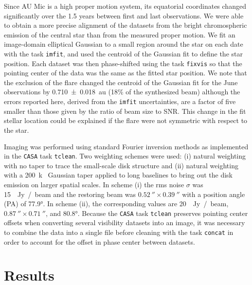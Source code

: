 \documentclass[modern]{aastex62}
\begin{document}
Since AU Mic is a high proper motion system, its equatorial coordinates changed significantly over the 1.5 years between first and last observations.  
We were able to obtain a more precise alignment of the datasets from the bright chromospheric emission of the central star than from the measured proper motion.
We fit an image-domain elliptical Gaussian to a small region around the star on each date with the task \texttt{imfit}, and used the centroid of the Gaussian fit to define the star position.
Each dataset was then phase-shifted using the task \texttt{fixvis} so that the pointing center of the data was the same as the fitted star position.
We note that the exclusion of the flare changed the centroid of the Gaussian fit for the June observations by \SI{0.710 \pm 0.018}{au} (18\% of the synthesized beam) although the errors reported here, derived from the \texttt{imfit} uncertainties, are a factor of five smaller than those given by the ratio of beam size to SNR.
This change in the fit stellar location could be explained if the flare were not symmetric with respect to the star.

Imaging was performed using standard Fourier inversion methods as implemented in the \texttt{CASA} task \texttt{tclean}. 
Two weighting schemes were used: (i) natural weighting with no taper to trace the small-scale disk structure and (ii) natural weighting with a \SI{200}{k\lambda} Gaussian taper applied to long baselines to bring out the disk emission on larger spatial scales. 
In scheme (i) the rms noise $\sigma$ was \SI{15}{\mu Jy / beam} and the restoring beam was $\SI{0.52}{\arcsecond} \times \SI{0.39}{\arcsecond}$ with a position angle (PA) of \ang[angle-symbol-over-decimal]{77.9}. 
In scheme (ii), the corresponding values are \SI{20}{\mu Jy / beam}, $\SI{0.87}{\arcsecond} \times \SI{0.71}{\arcsecond}$, and \ang[angle-symbol-over-decimal]{80.8}.
Because the \texttt{CASA} task \texttt{tclean} preserves pointing center offsets when converting several visibility datasets into an image, it was necessary to combine the data into a single file before cleaning with the task \texttt{concat} in order to account for the offset in phase center between datasets. 

\section{Results}
\label{section: results}
\end{document}
